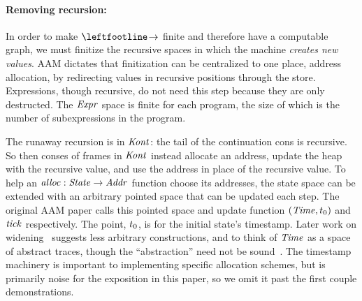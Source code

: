 \paragraph{Removing recursion:}
In order to make $\stepto$ finite and therefore have a computable graph, we must finitize the recursive spaces in which the machine \emph{creates new values}.
%
AAM dictates that finitization can be centralized to one place, address allocation, by redirecting values in recursive positions through the store.
%
Expressions, though recursive, do not need this step because they are only destructed.
%
The $\mathit{Expr}$ space is finite for each program, the size of which is the number of subexpressions in the program.
%

%
The runaway recursion is in $\mathit{Kont}$: the tail of the continuation cons is recursive.
%
So then conses of frames in $\mathit{Kont}$ instead allocate an address, update the heap with the recursive value, and use the address in place of the recursive value.
%
To help an $\mathit{alloc} : \mathit{State} \to \mathit{Addr}$ function choose its addresses, the state space can be extended with an arbitrary pointed space that can be updated each step.
%
The original AAM paper calls this pointed space and update function $(\mathit{Time},t_0)$ and $\mathit{tick}$ respectively.
%
The point, $t_0$, is for the initial state's timestamp.
%
Later work on widening~\citep{ianjohnson:DBLP:conf/vmcai/HardekopfWCK14} suggests less arbitrary constructions, and to think of $\mathit{Time}$ as a space of abstract traces, though the ``abstraction'' need not be sound~\citep{dvanhorn:Might2009Posteriori}.
%
The timestamp machinery is important to implementing specific allocation schemes, but is primarily noise for the exposition in this paper, so we omit it past the first couple demonstrations.




